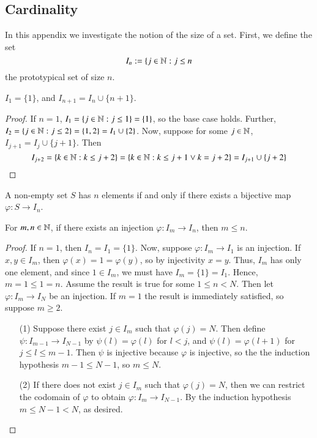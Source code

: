 \begin{subappendices}
    \section{Cardinality}

    In this appendix we investigate the notion of the size of a set. First, we define the set $$I_n := \{j \in \mathbb N:j \leq n$$ the prototypical set of size $n$.

    \begin{lem}
        $I_1 = \{1\}$, and $I_{n+1} = I_n \cup \{n+1\}$.
    \end{lem}
    \begin{proof}
        If $n  =1$, $I_1 = \{j \in \mathbb N: j \leq 1\} = \{1\}$, so the base case holds. Further, $I_2 = \{j \in \mathbb N:j \leq 2\} = \{1,2\} = I_1 \cup\{2\}$. Now, suppose for some $j \in \mathbb N$, $I_{j+1} = I_j \cup\{j+1\}$. Then $$I_{j+2} = \{k \in \mathbb N:k\leq j+2\} = \{k \in \mathbb N:k\leq j+1\lor k = j+2\} = I_{j+1}\cup \{j+2\}$$
    \end{proof}
    
    \begin{defn}
        A non-empty set $S$ has $n$ elements if and only if there exists a bijective map $\varphi:S\rightarrow I_n$.
    \end{defn}

    \begin{prop}\label{prop:1.8.2}
        For $m,n \in \mathbb N$, if there exists an injection $\varphi:I_m\rightarrow I_n$, then $m \leq n$.
    \end{prop}
    \begin{proof}
        If $n = 1$, then $I_n = I_1 = \{1\}$. Now, suppose $\varphi:I_m\rightarrow I_1$ is an injection. If $x,y \in I_m$, then $\varphi(x) = 1 = \varphi(y)$, so by injectivity $x = y$. Thus, $I_m$ has only one element, and since $1 \in I_m$, we must have $I_m = \{1\} = I_1$. Hence, $m = 1 \leq 1 = n$. Assume the result is true for some $1 \leq n < N$. Then let $\varphi:I_m\rightarrow I_N$ be an injection. If $m = 1$ the result is immediately satisfied, so suppose $m \geq 2$. 
        \begin{itemize}
            \item[(1)] Suppose there exist $j \in I_m$ such that $\varphi(j) = N$. Then define $\psi:I_{m-1}\rightarrow I_{N-1}$ by $\psi(l) = \varphi(l)$ for $l < j$, and $\psi(l) = \varphi(l+1)$ for $j \leq l \leq m-1$. Then $\psi$ is injective because $\varphi$ is injective, so the the induction hypothesis $m-1 \leq N-1$, so $m \leq N$.
            \item[(2)] If there does not exist $j \in I_m$ such that $\varphi(j) = N$, then we can restrict the codomain of $\varphi$ to obtain $\varphi:I_m\rightarrow I_{N-1}$. By the induction hypothesis $m \leq N-1 < N$, as desired.
        \end{itemize}
    \end{proof}


\end{subappendices}
